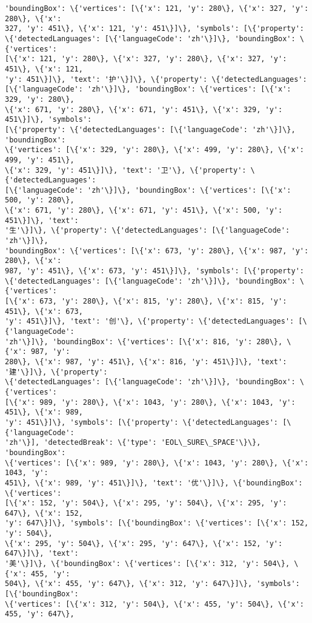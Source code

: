 \documentclass[11pt]{article}
\begin{document}
\begin{Verbatim}[commandchars=\\\{\}]
'boundingBox': \{'vertices': [\{'x': 121, 'y': 280\}, \{'x': 327, 'y': 280\}, \{'x':
327, 'y': 451\}, \{'x': 121, 'y': 451\}]\}, 'symbols': [\{'property':
\{'detectedLanguages': [\{'languageCode': 'zh'\}]\}, 'boundingBox': \{'vertices':
[\{'x': 121, 'y': 280\}, \{'x': 327, 'y': 280\}, \{'x': 327, 'y': 451\}, \{'x': 121,
'y': 451\}]\}, 'text': '护'\}]\}, \{'property': \{'detectedLanguages':
[\{'languageCode': 'zh'\}]\}, 'boundingBox': \{'vertices': [\{'x': 329, 'y': 280\},
\{'x': 671, 'y': 280\}, \{'x': 671, 'y': 451\}, \{'x': 329, 'y': 451\}]\}, 'symbols':
[\{'property': \{'detectedLanguages': [\{'languageCode': 'zh'\}]\}, 'boundingBox':
\{'vertices': [\{'x': 329, 'y': 280\}, \{'x': 499, 'y': 280\}, \{'x': 499, 'y': 451\},
\{'x': 329, 'y': 451\}]\}, 'text': '卫'\}, \{'property': \{'detectedLanguages':
[\{'languageCode': 'zh'\}]\}, 'boundingBox': \{'vertices': [\{'x': 500, 'y': 280\},
\{'x': 671, 'y': 280\}, \{'x': 671, 'y': 451\}, \{'x': 500, 'y': 451\}]\}, 'text':
'生'\}]\}, \{'property': \{'detectedLanguages': [\{'languageCode': 'zh'\}]\},
'boundingBox': \{'vertices': [\{'x': 673, 'y': 280\}, \{'x': 987, 'y': 280\}, \{'x':
987, 'y': 451\}, \{'x': 673, 'y': 451\}]\}, 'symbols': [\{'property':
\{'detectedLanguages': [\{'languageCode': 'zh'\}]\}, 'boundingBox': \{'vertices':
[\{'x': 673, 'y': 280\}, \{'x': 815, 'y': 280\}, \{'x': 815, 'y': 451\}, \{'x': 673,
'y': 451\}]\}, 'text': '创'\}, \{'property': \{'detectedLanguages': [\{'languageCode':
'zh'\}]\}, 'boundingBox': \{'vertices': [\{'x': 816, 'y': 280\}, \{'x': 987, 'y':
280\}, \{'x': 987, 'y': 451\}, \{'x': 816, 'y': 451\}]\}, 'text': '建'\}]\}, \{'property':
\{'detectedLanguages': [\{'languageCode': 'zh'\}]\}, 'boundingBox': \{'vertices':
[\{'x': 989, 'y': 280\}, \{'x': 1043, 'y': 280\}, \{'x': 1043, 'y': 451\}, \{'x': 989,
'y': 451\}]\}, 'symbols': [\{'property': \{'detectedLanguages': [\{'languageCode':
'zh'\}], 'detectedBreak': \{'type': 'EOL\_SURE\_SPACE'\}\}, 'boundingBox':
\{'vertices': [\{'x': 989, 'y': 280\}, \{'x': 1043, 'y': 280\}, \{'x': 1043, 'y':
451\}, \{'x': 989, 'y': 451\}]\}, 'text': '优'\}]\}, \{'boundingBox': \{'vertices':
[\{'x': 152, 'y': 504\}, \{'x': 295, 'y': 504\}, \{'x': 295, 'y': 647\}, \{'x': 152,
'y': 647\}]\}, 'symbols': [\{'boundingBox': \{'vertices': [\{'x': 152, 'y': 504\},
\{'x': 295, 'y': 504\}, \{'x': 295, 'y': 647\}, \{'x': 152, 'y': 647\}]\}, 'text':
'美'\}]\}, \{'boundingBox': \{'vertices': [\{'x': 312, 'y': 504\}, \{'x': 455, 'y':
504\}, \{'x': 455, 'y': 647\}, \{'x': 312, 'y': 647\}]\}, 'symbols': [\{'boundingBox':
\{'vertices': [\{'x': 312, 'y': 504\}, \{'x': 455, 'y': 504\}, \{'x': 455, 'y': 647\},

\end{Verbatim}
\end{document}
